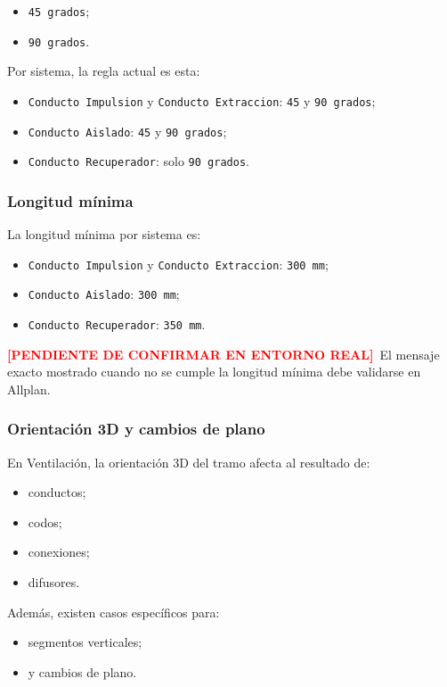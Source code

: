\documentclass[12pt,a4paper]{article}
\newcommand{\pendingtag}{\textcolor{red}{\textbf{[PENDIENTE DE CONFIRMAR EN ENTORNO REAL]}}}
\begin{document}
\begin{itemize}
\item \texttt{45 grados};
\item \texttt{90 grados}.
\end{itemize}

Por sistema, la regla actual es esta:

\begin{itemize}
\item \texttt{Conducto Impulsion} y \texttt{Conducto Extraccion}: \texttt{45} y \texttt{90 grados};
\item \texttt{Conducto Aislado}: \texttt{45} y \texttt{90 grados};
\item \texttt{Conducto Recuperador}: solo \texttt{90 grados}.
\end{itemize}

\subsubsection{Longitud mínima}

La longitud mínima por sistema es:

\begin{itemize}
\item \texttt{Conducto Impulsion} y \texttt{Conducto Extraccion}: \texttt{300 mm};
\item \texttt{Conducto Aislado}: \texttt{300 mm};
\item \texttt{Conducto Recuperador}: \texttt{350 mm}.
\end{itemize}

\pendingtag\ El mensaje exacto mostrado cuando no se cumple la longitud mínima debe validarse en Allplan.

\subsubsection{Orientación 3D y cambios de plano}

En Ventilación, la orientación 3D del tramo afecta al resultado de:

\begin{itemize}
\item conductos;
\item codos;
\item conexiones;
\item difusores.
\end{itemize}

Además, existen casos específicos para:

\begin{itemize}
\item segmentos verticales;
\item y cambios de plano.
\end{itemize}
\end{document}
